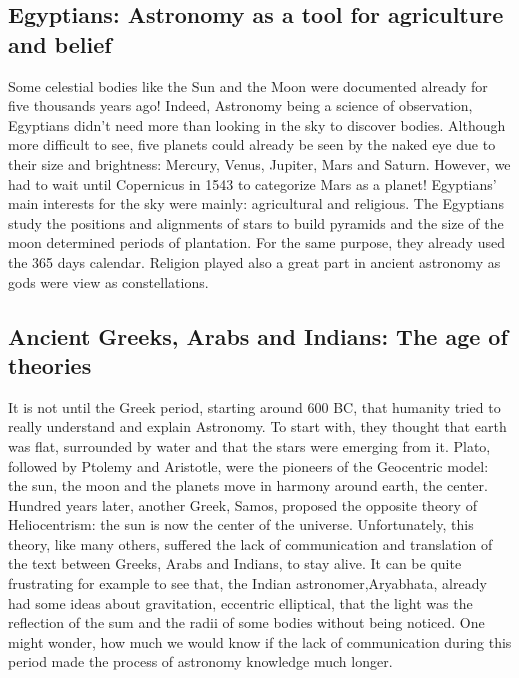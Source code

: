 \subsection*{Egyptians: Astronomy as a tool for agriculture and belief}
Some celestial bodies like the Sun and the Moon were documented already for five thousands years ago! Indeed, Astronomy being a science of observation, Egyptians didn't need more than looking in the sky to discover bodies. Although more difficult to see, five planets could already be seen by the naked eye due to their size and brightness: Mercury, Venus, Jupiter, Mars and Saturn. However, we had to wait until Copernicus in 1543 to categorize Mars as a planet! Egyptians' main interests for the sky were mainly: agricultural and religious. The Egyptians study the positions and alignments of stars to build pyramids and the size of the moon determined periods of plantation. For the same purpose, they already used the 365 days calendar. Religion played also a great part in ancient astronomy as gods were view as constellations.

\subsection*{Ancient Greeks, Arabs and Indians: The age of theories}
It is not until the Greek period, starting around 600 BC, that humanity tried to really understand and explain Astronomy. To start with, they thought that earth was flat, surrounded by water and that the stars were emerging from it. Plato, followed by Ptolemy and Aristotle, were the pioneers of the Geocentric model: the sun, the moon and the planets move in harmony around earth, the center. Hundred years later, another Greek, Samos, proposed the opposite theory of Heliocentrism: the sun is now the center of the universe. Unfortunately, this theory, like many others, suffered the lack of communication and translation of the text between Greeks, Arabs and Indians, to stay alive. It can be quite frustrating for example to see that, the Indian astronomer,Aryabhata, already had some ideas about gravitation, eccentric elliptical, that the light was the reflection of the sum and the radii of some bodies without being noticed. One might wonder, how much we would know if the lack of communication during this period made the process of astronomy knowledge much longer. \\


